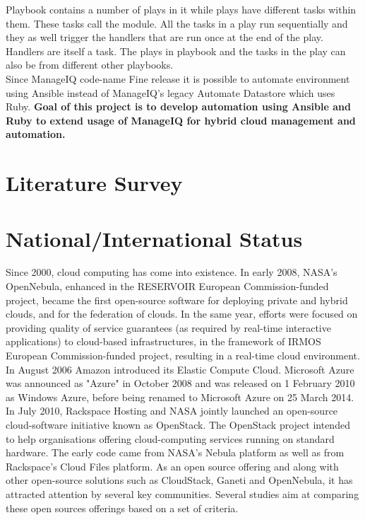 \documentclass[a4paper,12pt]{report}
\begin{document}
Playbook contains a number of plays in it while plays have different tasks within them. These tasks call the module. All the tasks in a play run sequentially and they as well trigger the handlers that are run once at the end of the play. Handlers are itself a task. The plays in playbook and the tasks in the play can also be from different other playbooks.\\

Since ManageIQ code-name Fine release it is possible to automate environment using Ansible instead of ManageIQ's legacy Automate Datastore which uses Ruby. \textbf{Goal of this project is to develop automation using Ansible and Ruby to extend usage of ManageIQ for hybrid cloud management and automation.}


\chapter{Literature Survey}

\chapter{National/International Status}
Since 2000, cloud computing has come into existence. In early 2008, NASA's OpenNebula, enhanced in the RESERVOIR European Commission-funded project, became the first open-source software for deploying private and hybrid clouds, and for the federation of clouds. In the same year, efforts were focused on providing quality of service guarantees (as required by real-time interactive applications) to cloud-based infrastructures, in the framework of IRMOS European Commission-funded project, resulting in a real-time cloud environment.\\

In August 2006 Amazon introduced its Elastic Compute Cloud. Microsoft Azure was announced as "Azure" in October 2008 and was released on 1 February 2010 as Windows Azure, before being renamed to Microsoft Azure on 25 March 2014.\\

In July 2010, Rackspace Hosting and NASA jointly launched an open-source cloud-software initiative known as OpenStack. The OpenStack project intended to help organisations offering cloud-computing services running on standard hardware. The early code came from NASA's Nebula platform as well as from Rackspace's Cloud Files platform. As an open source offering and along with other open-source solutions such as CloudStack, Ganeti and OpenNebula, it has attracted attention by several key communities. Several studies aim at comparing these open sources offerings based on a set of criteria.\\
\end{document}
